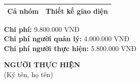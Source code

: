 {\begin{minipage}{\textwidth}
\begin{longtable}{|c|c|}
    \hline
    Cả nhóm & Thiết kế giao diện \\
    \hline
    \end{longtable}
    \vspace{0.5cm}
    \noindent \textbf{Chi phí:} 9.800.000 VNĐ \\
    \textbf{Chi phí người quản lý:} 4.000.000 VNĐ \\
    \textbf{Chi phí người thực hiện:} 5.800.000 VNĐ \\
    \vspace{1cm}
    \begin{flushleft}
        \hspace{8cm} \textbf{NGƯỜI THỰC HIỆN} \\
        \hspace{8.8cm} (Ký tên, họ tên) \\
        \vspace{1cm}
    \end{flushleft}
    \end{minipage}
}
%  
